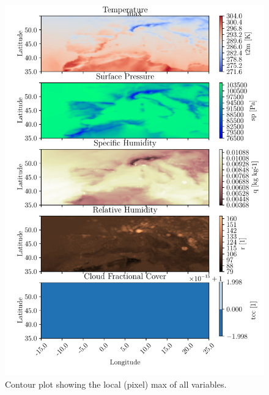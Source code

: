 \begin{figure}[ht]
    \centering
    \includegraphics{python_figs/contourplot_all_variables_max.pdf}
    \caption{Contour plot showing the local (pixel) max of all variables.}
    \label{fig:contour_max_all_vars}
\end{figure}


